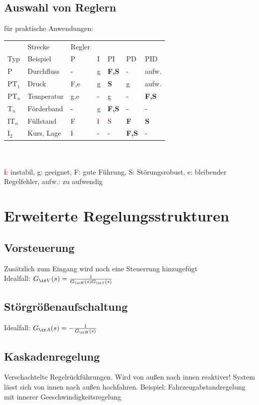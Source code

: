 \documentclass[german]{latex4ei/latex4ei_sheet}
\begin{document}
\begin{sectionbox}
\subsection{Auswahl von Reglern}
für praktische Anwendungen: \\

	\begin{tabular}{ll|lllll}
	 & Strecke & Regler \\
	Typ & Beispiel & P & I & PI & PD & PID\\ \mrule
	P & Durchfluss & - & g & \textbf{F,S} & - & aufw. \\
	PT$_1$ & Druck & F,e & g & \textbf{S} & g & aufw.\\
	PT$_n$ & Temperatur & g,e & - & g & - & \textbf{F,S} \\
	T$_n$ & Förderband & - & g & \textbf{F,S} & - & -\\
	IT$_n$ & Füllstand & F & \textcolor{red}{\bf i} & S & \textbf{F} & \textbf{S}\\
	I$_2$ & Kurs, Lage & \textcolor{red}{\bf i} & - & - & \textbf{F,S} & - \\
	\end{tabular}
\\ \\
	\textcolor{red}{\bf i}: instabil, g: geeignet, F: gute Führung, S: Störungsrobust, e: bleibender Regelfehler, aufw.: zu aufwendig
\end{sectionbox}

\section{Erweiterte Regelungsstrukturen}

\begin{sectionbox}
	\subsection{Vorsteuerung}
	Zusätzlich zum Eingang wird noch eine Steuerrung hinzugefügt\\
	Idealfall: $G_{\ir V}(s) = \frac{1}{G_{\ir H}(s) G_{\ir S}(s)}$

	\subsection{Störgrößenaufschaltung}
	Idealfall: $G_{\ir A}(s) = - \frac{1}{G_{\ir H}(s)}$

	\subsection{Kaskadenregelung}
	Verschachtelte Regelrückführungen. Wird von außen nach innen reaktiver!
	System lässt sich von innen nach außen hochfahren.
	Beispiel: Fahrzeugabstandregelung mit innerer Geeschwindigkeitsregelung
\end{sectionbox}
\end{document}

